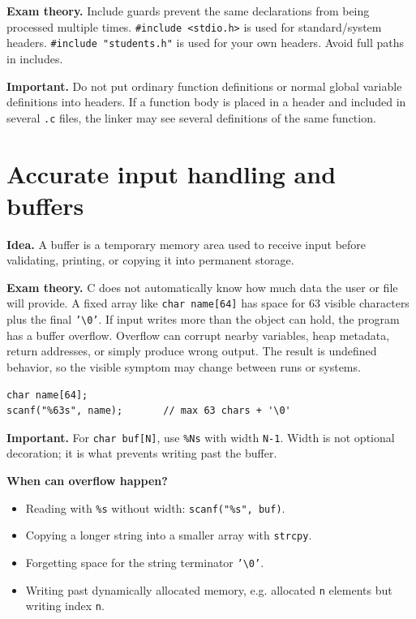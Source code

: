 \documentclass[10pt,a4paper]{article}
\newcommand{\idea}{\noindent\textbf{\textcolor{accentdark}{Idea.}} }
\newcommand{\theory}{\noindent\textbf{\textcolor{accentdark}{Exam theory.}} }
\newcommand{\important}[1]{\par\smallskip\noindent\colorbox{softyellow}{\parbox{\dimexpr\linewidth-2\fboxsep}{\textbf{\textcolor{accentdark}{Important.}} #1}}\par\smallskip}
\newcommand{\minihead}[1]{\par\smallskip\noindent\colorbox{softblue}{\parbox{\dimexpr\linewidth-2\fboxsep}{\textbf{#1}}}\par\smallskip}
\begin{document}
\theory Include guards prevent the same declarations from being processed multiple times. \texttt{\#include <stdio.h>} is used for standard/system headers. \texttt{\#include "students.h"} is used for your own headers. Avoid full paths in includes.

\important{Do not put ordinary function definitions or normal global variable definitions into headers. If a function body is placed in a header and included in several \texttt{.c} files, the linker may see several definitions of the same function.}

\section{Accurate input handling and buffers}
\idea A buffer is a temporary memory area used to receive input before validating, printing, or copying it into permanent storage.

\theory C does not automatically know how much data the user or file will provide. A fixed array like \texttt{char name[64]} has space for 63 visible characters plus the final \texttt{'\textbackslash0'}. If input writes more than the object can hold, the program has a buffer overflow. Overflow can corrupt nearby variables, heap metadata, return addresses, or simply produce wrong output. The result is undefined behavior, so the visible symptom may change between runs or systems.

\begin{lstlisting}[caption={Width-limited string read}]
char name[64];
scanf("%63s", name);       // max 63 chars + '\0'
\end{lstlisting}

\important{For \texttt{char buf[N]}, use \texttt{\%Ns} with width \texttt{N-1}. Width is not optional decoration; it is what prevents writing past the buffer.}

\minihead{When can overflow happen?}
\begin{itemize}
\item Reading with \texttt{\%s} without width: \texttt{scanf("\%s", buf)}.
\item Copying a longer string into a smaller array with \texttt{strcpy}.
\item Forgetting space for the string terminator \texttt{'\textbackslash0'}.
\item Writing past dynamically allocated memory, e.g. allocated \texttt{n} elements but writing index \texttt{n}.
\end{itemize}
\end{document}
